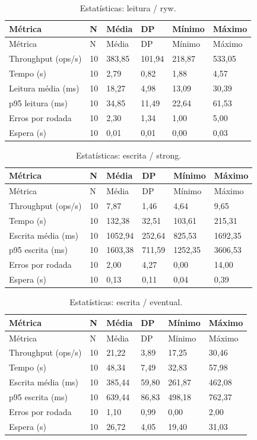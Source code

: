 \begingroup\small\setlength{\tabcolsep}{4pt}
\begin{longtable}{llllll}
\caption{Estatísticas: leitura / ryw.}\\
\toprule
Métrica & N & Média & DP & Mínimo & Máximo\\\midrule\endfirsthead
\toprule
Métrica & N & Média & DP & Mínimo & Máximo\\\midrule\endhead
\bottomrule\endfoot
Throughput (ops/s) & 10 & 383,85 & 101,94 & 218,87 & 533,05\\
Tempo (s) & 10 & 2,79 & 0,82 & 1,88 & 4,57\\
Leitura média (ms) & 10 & 18,27 & 4,98 & 13,09 & 30,39\\
p95 leitura (ms) & 10 & 34,85 & 11,49 & 22,64 & 61,53\\
Erros por rodada & 10 & 2,30 & 1,34 & 1,00 & 5,00\\
Espera (s) & 10 & 0,01 & 0,01 & 0,00 & 0,03\\
\end{longtable}
\endgroup

\begingroup\small\setlength{\tabcolsep}{4pt}
\begin{longtable}{llllll}
\caption{Estatísticas: escrita / strong.}\\
\toprule
Métrica & N & Média & DP & Mínimo & Máximo\\\midrule\endfirsthead
\toprule
Métrica & N & Média & DP & Mínimo & Máximo\\\midrule\endhead
\bottomrule\endfoot
Throughput (ops/s) & 10 & 7,87 & 1,46 & 4,64 & 9,65\\
Tempo (s) & 10 & 132,38 & 32,51 & 103,61 & 215,31\\
Escrita média (ms) & 10 & 1052,94 & 252,64 & 825,53 & 1692,35\\
p95 escrita (ms) & 10 & 1603,38 & 711,59 & 1252,35 & 3606,53\\
Erros por rodada & 10 & 2,00 & 4,27 & 0,00 & 14,00\\
Espera (s) & 10 & 0,13 & 0,11 & 0,04 & 0,39\\
\end{longtable}
\endgroup

\begingroup\small\setlength{\tabcolsep}{4pt}
\begin{longtable}{llllll}
\caption{Estatísticas: escrita / eventual.}\\
\toprule
Métrica & N & Média & DP & Mínimo & Máximo\\\midrule\endfirsthead
\toprule
Métrica & N & Média & DP & Mínimo & Máximo\\\midrule\endhead
\bottomrule\endfoot
Throughput (ops/s) & 10 & 21,22 & 3,89 & 17,25 & 30,46\\
Tempo (s) & 10 & 48,34 & 7,49 & 32,83 & 57,98\\
Escrita média (ms) & 10 & 385,44 & 59,80 & 261,87 & 462,08\\
p95 escrita (ms) & 10 & 639,44 & 86,83 & 498,18 & 762,37\\
Erros por rodada & 10 & 1,10 & 0,99 & 0,00 & 2,00\\
Espera (s) & 10 & 26,72 & 4,05 & 19,40 & 31,03\\
\end{longtable}
\endgroup

